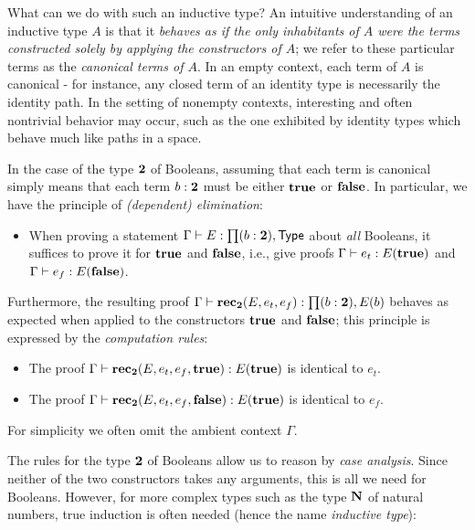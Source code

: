 What can we do with such an inductive type? An intuitive understanding of an inductive type $A$ is that it \emph{behaves as if the only inhabitants of $A$ were the terms constructed solely by applying the constructors of $A$}; we refer to these particular terms as the \emph{canonical terms of $A$}. In an empty context,
each term of $A$ is canonical - for instance, any closed term of an identity type is necessarily the identity path. In the setting of nonempty contexts,  
interesting and often nontrivial behavior may occur, such as the one exhibited by identity types which behave much like paths in a space.

In the case of the type $\mathbf{2}$ of Booleans, assuming that each term is canonical simply means that each term $b : \mathbf{2}$ must be either $\mathbf{true}$ or $\mathbf{false}$. In particular, we have the principle of \emph{(dependent) elimination}:

\begin{itemize}
\item When proving a statement $\Gamma \der E : \prd{b : \two} \type$ about \emph{all} Booleans, it suffices to prove it for $\mathbf{true}$ and $\mathbf{false}$, i.e., give proofs
$\Gamma \vdash e_t : E(\mathbf{true})$ and $\Gamma \vdash e_f : E(\mathbf{false})$.
\end{itemize}

Furthermore, the resulting proof $\Gamma \der \rec_\two(E,e_t,e_f): \prd{b : \two}E(b)$ behaves as expected when applied to the constructors $\mathbf{true}$ and $\mathbf{false}$; this principle is expressed by the \emph{computation rules}:
\begin{itemize}
\item The proof $\Gamma \vdash \mathbf{rec}_\mathbf{2}(E,e_t,e_f,\mathbf{true}) : E(\mathbf{true})$ is identical to $e_t$.
\item The proof $\Gamma \vdash \mathbf{rec}_\mathbf{2}(E,e_t,e_f,\mathbf{false}) : E(\mathbf{true})$ is identical to $e_f$.
\end{itemize}
For simplicity we often omit the ambient context $\Gamma$.

The rules for the type $\mathbf{2}$ of Booleans allow us to reason by \emph{case analysis}. Since neither of the two constructors takes any arguments, this is all we need for Booleans. However, for more complex types such as the type $\mathbf{N}$ of natural numbers, true induction is often needed (hence the name \emph{inductive type}):

